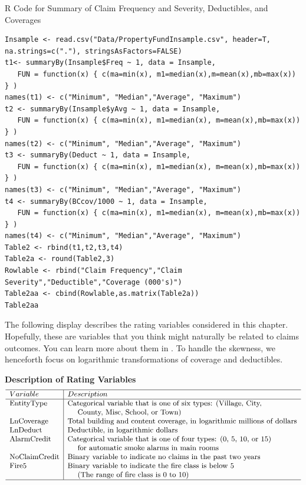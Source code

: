 \documentclass[]{book}
\theoremstyle{definition}
\theoremstyle{definition}
\theoremstyle{definition}
\theoremstyle{remark}
\begin{document}
R Code for Summary of Claim Frequency and Severity, Deductibles, and
Coverages

\hypertarget{display.DeductCov.2}{}
\begin{verbatim}
Insample <- read.csv("Data/PropertyFundInsample.csv", header=T, na.strings=c("."), stringsAsFactors=FALSE)
t1<- summaryBy(Insample$Freq ~ 1, data = Insample, 
   FUN = function(x) { c(ma=min(x), m1=median(x),m=mean(x),mb=max(x)) } )
names(t1) <- c("Minimum", "Median","Average", "Maximum")
t2 <- summaryBy(Insample$yAvg ~ 1, data = Insample, 
   FUN = function(x) { c(ma=min(x), m1=median(x), m=mean(x),mb=max(x)) } )
names(t2) <- c("Minimum", "Median","Average", "Maximum")
t3 <- summaryBy(Deduct ~ 1, data = Insample, 
   FUN = function(x) { c(ma=min(x), m1=median(x), m=mean(x),mb=max(x)) } )
names(t3) <- c("Minimum", "Median","Average", "Maximum")
t4 <- summaryBy(BCcov/1000 ~ 1, data = Insample, 
   FUN = function(x) { c(ma=min(x), m1=median(x), m=mean(x),mb=max(x)) } )
names(t4) <- c("Minimum", "Median","Average", "Maximum")
Table2 <- rbind(t1,t2,t3,t4)
Table2a <- round(Table2,3)
Rowlable <- rbind("Claim Frequency","Claim Severity","Deductible","Coverage (000's)")
Table2aa <- cbind(Rowlable,as.matrix(Table2a))
Table2aa
\end{verbatim}

The following display describes the rating variables considered in this
chapter. Hopefully, these are variables that you think might naturally
be related to claims outcomes. You can learn more about them in
\citet{frees2016multivariate}. To handle the skewness, we henceforth
focus on logarithmic transformations of coverage and deductibles.

\textbf{Description of Rating Variables} \[{\small \begin{matrix}
\begin{array}{ l | l}
\hline
Variable    & Description \\
\hline
\text{EntityType}   & \text{Categorical variable that is one of six types:  (Village, City,} \\
& ~~~~ \text{County, Misc, School, or Town)} \\
\text{LnCoverage}   & \text{Total building and content coverage, in logarithmic millions of dollars}\\
\text{LnDeduct}     & \text{Deductible, in logarithmic dollars} \\
\text{AlarmCredit}  & \text{Categorical variable that is one of four types:  (0, 5, 10, or 15)} \\
 &  ~~~~   \text{for automatic smoke alarms in main rooms} \\
\text{NoClaimCredit}    & \text{Binary variable to indicate no claims in the past two years} \\
\text{Fire5 }           & \text{Binary variable to indicate the fire class is below 5} \\
& ~~~~ \text{(The range of fire class is 0 to 10)} \\
\hline
\end{array}
\end{matrix}}\]
\end{document}
